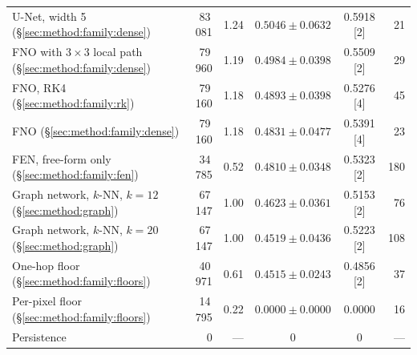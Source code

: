 \begin{table}[t]
\begin{tabular}{p{} r r c c r}
    U-Net, width 5 (\S\ref{sec:method:family:dense}) & 83\,081 & 1.24 &
      $0.5046 \pm 0.0632$ & 0.5918 [2] & 21 \\
    FNO with $3 \times 3$ local path (\S\ref{sec:method:family:dense}) &
      79\,960 & 1.19 & $0.4984 \pm 0.0398$ & 0.5509 [2] & 29 \\
    FNO, RK4 (\S\ref{sec:method:family:rk}) & 79\,160 & 1.18 &
      $0.4893 \pm 0.0398$ & 0.5276 [4] & 45 \\
    FNO (\S\ref{sec:method:family:dense}) & 79\,160 & 1.18 &
      $0.4831 \pm 0.0477$ & 0.5391 [4] & 23 \\
    FEN, free-form only (\S\ref{sec:method:family:fen}) & 34\,785 & 0.52 &
      $0.4810 \pm 0.0348$ & 0.5323 [2] & 180 \\
    Graph network, $k$-NN, $k = 12$ (\S\ref{sec:method:graph}) & 67\,147 &
      1.00 & $0.4623 \pm 0.0361$ & 0.5153 [2] & 76 \\
    Graph network, $k$-NN, $k = 20$ (\S\ref{sec:method:graph}) & 67\,147 &
      1.00 & $0.4519 \pm 0.0436$ & 0.5223 [2] & 108 \\
    \midrule
    One-hop floor (\S\ref{sec:method:family:floors}) & 40\,971 & 0.61 &
      $0.4515 \pm 0.0243$ & 0.4856 [2] & 37 \\
    Per-pixel floor (\S\ref{sec:method:family:floors}) & 14\,795 & 0.22 &
      $0.0000 \pm 0.0000$ & 0.0000 & 16 \\
    Persistence & 0 & --- & 0 & 0 & --- \\
    \bottomrule
  \end{tabular}
\end{table}

